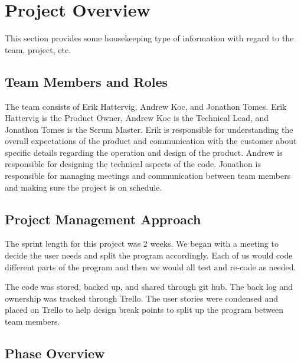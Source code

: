 

\chapter{Project Overview}
This section provides some housekeeping type of information with regard to the 
team, project, etc. 



\section{Team Members and Roles}
The team consists of Erik Hattervig, Andrew Koc, and Jonathon Tomes. Erik Hattervig is the Product Owner, Andrew Koc is the Technical Lead, and Jonathon Tomes is the Scrum Master. Erik is responsible for understanding the overall expectations of the product and communication with the customer about specific details regarding the operation and design of the product. Andrew is responsible for designing the technical aspects of the code. Jonathon is responsible for managing meetings and communication between team members and making sure the project is on schedule.


\section{Project  Management Approach}

	The sprint length for this project was 2 weeks. We began with a meeting to
decide the user needs and split the program accordingly. Each of us would code
different parts of the program and then we would all test and re-code as needed.

	The code was stored, backed up, and shared through git hub. The back log and ownership 
was tracked through Trello. The user stories were condensed and placed on Trello to help 
design break points to split up the program between team members. 

\section{Phase  Overview}


